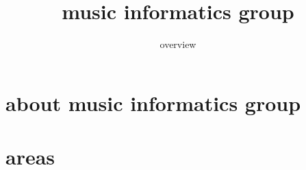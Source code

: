 
\usepackage{multirow}
\AtBeginBibliography{\tiny}

\title{music informatics group}
\subtitle{overview} 


	

    \section[about]{about music informatics group}
        
        
    \section[areas]{areas}
